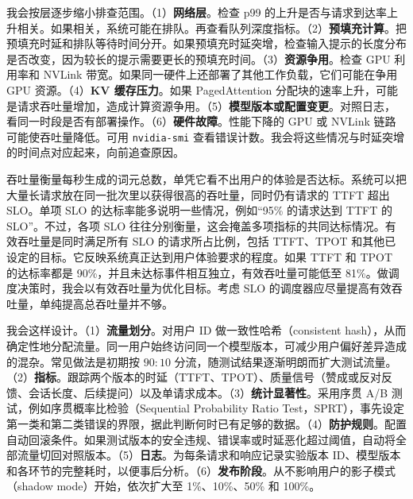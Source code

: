 \begin{interview}
我会按层逐步缩小排查范围。（1）\textbf{网络层}。检查 p99 的上升是否与请求到达率上升相关。如果相关，系统可能在排队。再查看队列深度指标。（2）\textbf{预填充计算}。把预填充时延和排队等待时间分开。如果预填充时延突增，检查输入提示的长度分布是否改变，因为较长的提示需要更长的预填充时间。（3）\textbf{资源争用}。检查 GPU 利用率和 NVLink 带宽。如果同一硬件上还部署了其他工作负载，它们可能在争用 GPU 资源。（4）\textbf{KV 缓存压力}。如果 PagedAttention 分配块的速率上升，可能是请求吞吐量增加，造成计算资源争用。（5）\textbf{模型版本或配置变更}。对照日志，
看同一时段是否有部署操作。（6）\textbf{硬件故障}。性能下降的 GPU 或 NVLink 链路可能使吞吐量降低。可用 \texttt{nvidia-smi} 查看错误计数。我会将这些情况与时延突增的时间点对应起来，向前追查原因。

吞吐量衡量每秒生成的词元总数，单凭它看不出用户的体验是否达标。系统可以把大量长请求放在同一批次里以获得很高的吞吐量，同时仍有请求的 TTFT 超出 SLO。单项 SLO 的达标率能多说明一些情况，例如“95\% 的请求达到 TTFT 的 SLO”。不过，各项 SLO 往往分别衡量，这会掩盖多项指标的共同达标情况。有效吞吐量是同时满足所有 SLO 的请求所占比例，包括 TTFT、TPOT 和其他已设定的目标。它反映系统真正达到用户体验要求的程度。如果 TTFT 和 TPOT 的达标率都是 90\%，并且未达标事件相互独立，有效吞吐量可能低至 81\%。做调度决策时，我会以有效吞吐量为优化目标。考虑 SLO 的调度器应尽量提高有效吞吐量，单纯提高总吞吐量并不够。

我会这样设计。（1）\textbf{流量划分}。对用户 ID 做一致性哈希（consistent hash），从而确定性地分配流量。同一用户始终访问同一个模型版本，可减少用户偏好差异造成的混杂。常见做法是初期按 $90{:}10$ 分流，随测试结果逐渐明朗而扩大测试流量。（2）\textbf{指标}。跟踪两个版本的时延（TTFT、TPOT）、质量信号（赞成或反对反馈、会话长度、后续提问）以及单请求成本。（3）\textbf{统计显著性}。采用序贯 A/B 测试，例如序贯概率比检验（Sequential Probability Ratio Test，SPRT），事先设定第一类和第二类错误的界限，据此判断何时已有足够的数据。（4）\textbf{防护规则}。配置自动回滚条件。如果测试版本的安全违规、错误率或时延恶化超过阈值，自动将全部流量切回对照版本。（5）\textbf{日志}。为每条请求和响应记录实验版本 ID、模型版本和各环节的完整耗时，以便事后分析。（6）\textbf{发布阶段}。从不影响用户的影子模式（shadow mode）开始，依次扩大至 1\%、10\%、50\% 和 100\%。


\end{interview}
